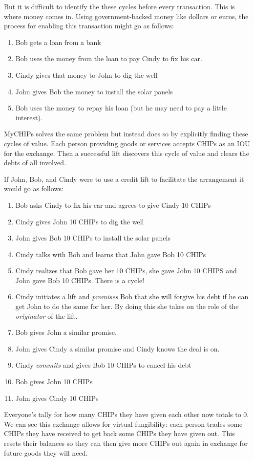 \documentclass[runningheads]{llncs}
\begin{document}
But it is difficult to identify the these cycles before every transaction. This is where money comes in. Using government-backed money like dollars or euros, the process for enabling this transaction might go as follows:
\begin{enumerate}
\item Bob gets a loan from a bank
\item Bob uses the money from the loan to pay Cindy to fix his car.
\item Cindy gives that money to John to dig the well
\item John gives Bob the money to install the solar panels
\item Bob uses the money to repay his loan (but he may need to pay a little 
interest).
\end{enumerate}

MyCHIPs solves the same problem but instead does so by explicitly finding these cycles of value. Each person providing goods or services accepts CHIPs as an IOU for the exchange. Then a successful lift discovers this cycle of value and clears the debts of all involved.

If John, Bob, and Cindy were to use a credit lift to facilitate the arrangement it would go as follows:
\begin{enumerate}
\item Bob asks Cindy to fix his car and agrees to give Cindy 10 CHIPs 
\item Cindy gives John 10 CHIPs to dig the well
\item John gives Bob 10 CHIPs to install the solar panels
\item Cindy talks with Bob and learns that John gave Bob 10 CHIPs
\item Cindy realizes that Bob gave her 10 CHIPs, she gave John 10 CHIPS and John gave Bob 10 CHIPs. There is a cycle!
\item Cindy initiates a lift and \emph{promises} Bob that she will forgive his debt if he can get John to do the same for her. By doing this she takes on the role of the \emph{originator} of the lift. 
\item Bob gives John a similar promise.
\item John gives Cindy a similar promise and Cindy knows the deal is on.
\item Cindy \emph{commits} and gives Bob 10 CHIPs to cancel his debt
\item Bob gives John 10 CHIPs
\item John gives Cindy 10 CHIPs
\end{enumerate}
Everyone's tally for how many CHIPs they have given each other now totals to 0.
We can see this exchange allows for virtual fungibility: each person trades some CHIPs they have received to get back some CHIPs they have given out. 
This resets their balances so they can then give more CHIPs out again in exchange for future goods they will need. 
\end{document}
